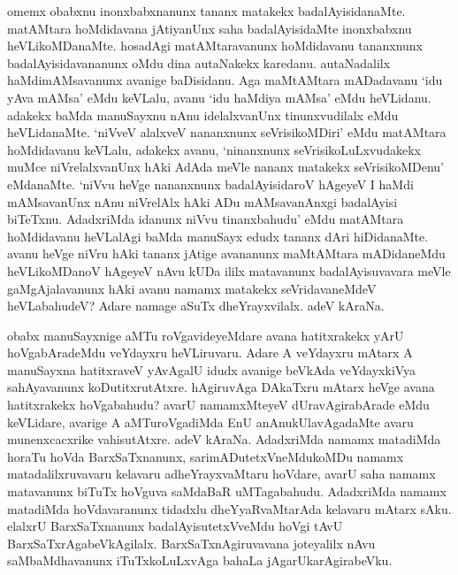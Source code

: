 omemx obabxnu inonxbabxnanunx tananx matakekx badalAyisidanaMte. matAMtara hoMdidavana jAtiyanUnx saha badalAyisidaMte inonxbabxnu heVLikoMDanaMte. hosadAgi matAMtaravanunx hoMdidavanu tananxnunx badalAyisidavananunx oMdu dina autaNakekx karedanu. autaNadalilx haMdimAMsavanunx avanige baDisidanu. Aga maMtAMtara mADadavanu `idu yAva mAMsa' eMdu keVLalu, avanu `idu haMdiya mAMsa' eMdu heVLidanu. adakekx baMda manuSayxnu nAnu idelalxvanUnx tinunxvudilalx eMdu heVLidanaMte. `niVveV alalxveV nananxnunx seVrisikoMDiri' eMdu 
matAMtara hoMdidavanu keVLalu, adakekx avanu, `ninanxnunx seVrisikoLuLxvudakekx muMce niVrelalxvanUnx hAki AdAda meVle nananx matakekx seVrisikoMDenu' eMdanaMte. `niVvu heVge nananxnunx badalAyisidaroV hAgeyeV I haMdi mAMsavanUnx nAnu niVrelAlx hAki ADu mAMsavanAnxgi badalAyisi biTeTxnu. AdadxriMda idanunx niVvu tinanxbahudu' eMdu matAMtara hoMdidavanu heVLalAgi baMda manuSayx edudx tananx dAri hiDidanaMte. avanu heVge niVru hAki tananx jAtige avananunx maMtAMtara mADidaneMdu heVLikoMDanoV hAgeyeV nAvu kUDa ililx matavanunx badalAyisuvavara meVle gaMgAjalavanunx hAki avanu namamx matakekx seVridavaneMdeV heVLabahudeV? Adare namage aSuTx dheYrayxvilalx. adeV kAraNa.

obabx manuSayxnige aMTu roVgavideyeMdare avana hatitxrakekx yArU hoVgabAradeMdu veYdayxru heVLiruvaru. Adare A veYdayxru mAtarx A manuSayxna hatitxraveV yAvAgalU idudx avanige beVkAda veYdayxkiVya sahAyavanunx koDutitxrutAtxre. hAgiruvAga DAkaTxru mAtarx heVge avana hatitxrakekx hoVgabahudu? avarU namamxMteyeV dUravAgirabArade eMdu keVLidare, avarige A aMTuroVgadiMda EnU anAnukUlavAgadaMte avaru munenxcacxrike vahisutAtxre. adeV kAraNa. AdadxriMda namamx matadiMda horaTu hoVda BarxSaTxnanunx, sarimADutetxVneMdukoMDu 
namamx matadalilxruvavaru kelavaru adheYrayxvaMtaru hoVdare, avarU saha namamx matavanunx biTuTx hoVguva saMdaBaR uMTagabahudu. AdadxriMda namamx matadiMda hoVdavaranunx tidadxlu dheYyaRvaMtarAda kelavaru mAtarx sAku. elalxrU BarxSaTxnanunx badalAyisutetxVveMdu hoVgi tAvU BarxSaTxrAgabeVkAgilalx. BarxSaTxnAgiruvavana joteyalilx nAvu saMbaMdhavanunx iTuTxkoLuLxvAga bahaLa jAgarUkarAgirabeVku.

